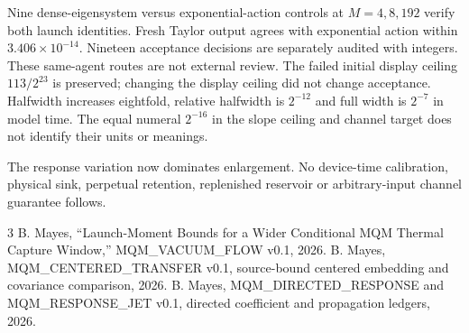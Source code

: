 \documentclass[a4paper,journal]{IEEEtran}
\begin{document}
Nine dense-eigensystem versus exponential-action controls at $M=4,8,192$ verify both launch identities. Fresh Taylor output agrees with exponential action within $3.406\times10^{-14}$. Nineteen acceptance decisions are separately audited with integers. These same-agent routes are not external review. The failed initial display ceiling $113/2^{23}$ is preserved; changing the display ceiling did not change acceptance. Halfwidth increases eightfold, relative halfwidth is $2^{-12}$ and full width is $2^{-7}$ in model time. The equal numeral $2^{-16}$ in the slope ceiling and channel target does not identify their units or meanings.

The response variation now dominates enlargement. No device-time calibration, physical sink, perpetual retention, replenished reservoir or arbitrary-input channel guarantee follows.
\begin{thebibliography}{3}
 B. Mayes, ``Launch-Moment Bounds for a Wider Conditional MQM Thermal Capture Window,'' MQM\_VACUUM\_FLOW v0.1, 2026.
 B. Mayes, MQM\_CENTERED\_TRANSFER v0.1, source-bound centered embedding and covariance comparison, 2026.
 B. Mayes, MQM\_DIRECTED\_RESPONSE and MQM\_RESPONSE\_JET v0.1, directed coefficient and propagation ledgers, 2026.
\end{thebibliography}
\end{document}
